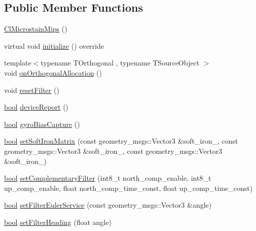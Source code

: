 \subsection*{Public Member Functions}
\begin{DoxyCompactItemize}
\item 
\hyperlink{classcl__microstrain__mips_1_1ClMicrostainMips_ac4708eb9946be3b716442e12f7296b2c}{Cl\+Microstain\+Mips} ()
\item 
virtual void \hyperlink{classcl__microstrain__mips_1_1ClMicrostainMips_ab52b739d8230f932ad3042fcd1b697f4}{initialize} () override
\item 
{\footnotesize template$<$typename T\+Orthogonal , typename T\+Source\+Object $>$ }\\void \hyperlink{classcl__microstrain__mips_1_1ClMicrostainMips_a47e6c127c560cf2e1443ef0d7368f4ad}{on\+Orthogonal\+Allocation} ()
\item 
void \hyperlink{classcl__microstrain__mips_1_1ClMicrostainMips_ad53d21cfe5e6f8089ff00583d364d0e5}{reset\+Filter} ()
\item 
\hyperlink{classbool}{bool} \hyperlink{classcl__microstrain__mips_1_1ClMicrostainMips_a4987d87f50c6ce20102f6e3359619b88}{device\+Report} ()
\item 
\hyperlink{classbool}{bool} \hyperlink{classcl__microstrain__mips_1_1ClMicrostainMips_ada40a42a0d479c9651bc4a735a76ce39}{gyro\+Bias\+Capture} ()
\item 
\hyperlink{classbool}{bool} \hyperlink{classcl__microstrain__mips_1_1ClMicrostainMips_a24996ea87cf409ae0a912931dc088eb2}{set\+Soft\+Iron\+Matrix} (const geometry\+\_\+msgs\+::\+Vector3 \&soft\+\_\+iron\+\_, const geometry\+\_\+msgs\+::\+Vector3 \&soft\+\_\+iron\+\_, const geometry\+\_\+msgs\+::\+Vector3 \&soft\+\_\+iron\+\_)
\item 
\hyperlink{classbool}{bool} \hyperlink{classcl__microstrain__mips_1_1ClMicrostainMips_a4dfbed2e601dd990b5fd89fb670656b9}{set\+Complementary\+Filter} (int8\+\_\+t north\+\_\+comp\+\_\+enable, int8\+\_\+t up\+\_\+comp\+\_\+enable, float north\+\_\+comp\+\_\+time\+\_\+const, float up\+\_\+comp\+\_\+time\+\_\+const)
\item 
\hyperlink{classbool}{bool} \hyperlink{classcl__microstrain__mips_1_1ClMicrostainMips_af5d9e53254b967a2bc02343c2010a47b}{set\+Filter\+Euler\+Service} (const geometry\+\_\+msgs\+::\+Vector3 \&angle)
\item 
\hyperlink{classbool}{bool} \hyperlink{classcl__microstrain__mips_1_1ClMicrostainMips_addede8b2d6eac488ff9de6acd0b28fa7}{set\+Filter\+Heading} (float angle)

\end{DoxyCompactItemize}
